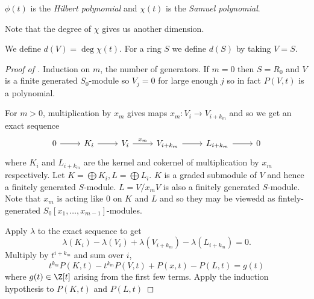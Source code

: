 \documentclass[a4paper]{article}
\begin{document}
\begin{definition}
  \(\phi(t)\) is the \emph{Hilbert polynomial} and \(\chi(t)\) is the \emph{Samuel polynomial}.
\end{definition}

Note that the degree of \(\chi\) gives us another dimension.

\begin{definition}
  We define \(d(V) = \deg \chi(t)\). For a ring \(S\) we define \(d(S)\) by taking \(V = S\).
\end{definition}

\begin{proof}[Proof of ]
  Induction on \(m\), the number of generators. If \(m = 0\) then \(S = R_0\) and \(V\) is a finite generated \(S_0\)-module so \(V_j = 0\) for large enough \(j\) so in fact \(P(V, t)\) is a polynomial.

  For \(m > 0\), multiplication by \(x_m\) gives maps \(x_m: V_i \to V_{i + k_m}\) and so we get an exact sequence
  \[
    \begin{tikzcd}
      0 \ar[r] & K_i \ar[r] & V_i \ar[r, "x_m"] & V_{i + k_m} \ar[r] & L_{i + k_m} \ar[r] & 0
    \end{tikzcd}
  \]
  where \(K_i\) and \(L_{i + k_m}\) are the kernel and cokernel of multiplication by \(x_m\) respectively. Let \(K = \bigoplus K_i, L = \bigoplus L_i\). \(K\) is a graded submodule of \(V\) and hence a finitely generated \(S\)-module. \(L = V/x_m V\) is also a finitely generated \(S\)-module. Note that \(x_m\) is acting like \(0\) on \(K\) and \(L\) and so they may be viewedd as fintely-generated \(S_0[x_1, \dots, x_{m - 1}]\)-modules.

  Apply \(\lambda\) to the exact sequence to get
  \[
    \lambda(K_i) - \lambda(V_i) + \lambda(V_{i + k_m}) - \lambda(L_{i + k_m}) = 0.
  \]
  Multiply by \(t^{i + k_m}\) and sum over \(i\),
  \[
    t^{k_m} P(K, t) - t^{k_m} P(V, t) + P(x, t) - P(L, t) = g(t)
  \]
  where \(g(t) \in \Z[t]\) arising from the first few terms. Apply the induction hypothesis to \(P(K, t)\) and \(P(L, t)\)
\end{proof}
\end{document}
